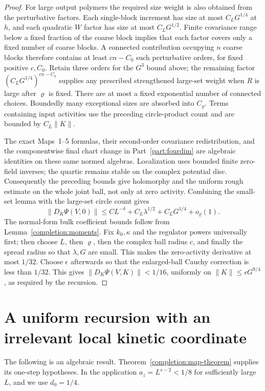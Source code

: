 \documentclass[11pt]{article}
\begin{document}
\begin{proof}
For large output polymers the required size weight is also obtained
from the perturbative factors. Each single-block increment has size at
most \(C_LG^{1/4}\) at \(h\), and each quadratic \(W\) factor has size
at most \(C_LG^{1/2}\). Finite covariance range below a fixed fraction
of the coarse block implies that each factor covers only a fixed
number of coarse blocks. A connected contribution occupying \(n\)
coarse blocks therefore contains at least \(cn-C_0\) such perturbative
orders, for fixed positive \(c,C_0\). Retain three orders for the
\(G^3\) bound above; the remaining factor
\((C_LG^{1/4})^{cn-C_0}\) supplies any prescribed strengthened
large-set weight when \(R\) is large after \(\varrho\) is fixed.
There are at most a fixed exponential number of connected choices.
Boundedly many exceptional sizes are absorbed into \(C_\varrho\).
Terms containing input activities use the preceding circle-product
count and are bounded by \(C_L\|K\|\).

The exact Maps~1--5 formulas, their second-order covariance
redistribution, and the componentwise final chart change in Part~\ref{part:fourdim}
are algebraic identities on these same normed algebras. Localization
uses bounded finite zero-field inverses; the quartic remains stable on
the complex potential disc. Consequently the preceding bounds give
holomorphy and the uniform rough estimate on the whole joint ball,
not only at zero activity. Combining the small-set lemma with the
large-set circle count gives
\[
 \|D_K\Psi(V,0)\|
       \le CL^{-\delta}+C_L\lambda^{1/2}+C_LG^{1/4}
          +o_\varrho(1).
\]
The normal-form bulk coefficient bounds follow from
Lemma~\ref{completion:moments}. Fix \(k_0,\kappa\) and the regulator powers universally first; then
choose \(L\), then \(\varrho\), then the complex ball radius \(c\),
and finally the
spread radius so that \(\lambda,G\) are small. This makes the zero-activity derivative at most \(1/32\). Choose
\(\epsilon\) afterwards so that the enlarged-ball Cauchy correction is
less than \(1/32\). This gives \(\|D_K\Psi(V,K)\|<1/16\), uniformly
on \(\|K\|\le\epsilon G^{9/4}\), as required by the recursion.

\end{proof}

\section{A uniform recursion with an irrelevant local kinetic coordinate}
\label{frac:sec:recursion}
The following is an algebraic result. Theorem~\ref{completion:map-theorem} supplies its one-step
hypotheses. In the application \(a_z=L^{s-2}<1/8\) for sufficiently
large \(L\), and we use \(d_0=1/4\).
\end{document}
